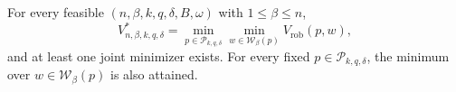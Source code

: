 For every feasible \((n,\beta,k,q,\delta,B,\omega)\) with \(1\le\beta\le n\),
\[
V^*_{n,\beta,k,q,\delta}
=\min_{p\in\mathcal P_{k,q,\delta}}
\min_{w\in\mathcal W_\beta(p)}V_{\mathrm{rob}}(p,w),
\]
and at least one joint minimizer exists.  For every fixed \(p\in\mathcal P_{k,q,\delta}\), the minimum over \(w\in\mathcal W_\beta(p)\) is also attained.